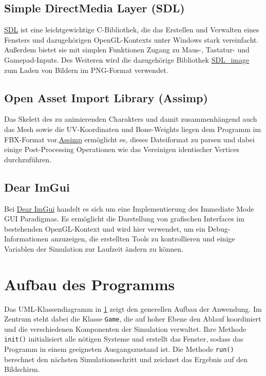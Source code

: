 \subsection{Simple DirectMedia Layer (SDL)}
\href{https://www.libsdl.org/index.php}{SDL} ist eine leichtgewichtige C-Bibliothek, die das Erstellen und Verwalten eines Fensters und dazugehörigen OpenGL-Kontexts unter Windows stark vereinfacht. Außerdem bietet sie mit simplen Funktionen Zugang zu Maus-, Tastatur- und Gamepad-Inputs. Des Weiteren wird die dazugehörige Bibliothek \href{https://www.libsdl.org/projects/SDL_image/}{SDL\_image} zum Laden von Bildern im PNG-Format verwendet.

\subsection{Open Asset Import Library (Assimp)}
Das Skelett des zu animierenden Charakters und damit zusammenhängend auch das Mesh sowie die UV-Koordinaten und Bone-Weights liegen dem Programm im FBX-Format vor.\href{http://assimp.org/}{Assimp} ermöglicht es, dieses Dateiformat zu parsen und dabei einige Post-Processing Operationen wie das Vereinigen identischer Vertices durchzuführen.

\subsection{Dear ImGui}
Bei \href{https://github.com/ocornut/imgui}{Dear ImGui} handelt es sich um eine Implementierung des Immediate Mode GUI Paradigmas. Es ermöglicht die Darstellung von grafischen Interfaces im bestehenden OpenGL-Kontext und wird hier verwendet, um ein Debug-Informationen anzuzeigen, die erstellten Tools zu kontrollieren und einige Variablen der Simulation zur Laufzeit ändern zu können.

\section{Aufbau des Programms}
Das UML-Klassendiagramm in \ref{} zeigt den generellen Aufbau der Anwendung. Im Zentrum steht dabei die Klasse \lstinline{Game}, die auf hoher Ebene den Ablauf koordiniert und die verschiedenen Komponenten der Simulation verwaltet. Ihre Methode \lstinline{init()} initialisiert alle nötigen Systeme und erstellt das Fenster, sodass das Programm in einem geeigneten Ausgangszustand ist. Die Methode \lstinline{run()} berechnet den nächsten Simulationsschritt und zeichnet das Ergebnis auf den Bildschirm.

